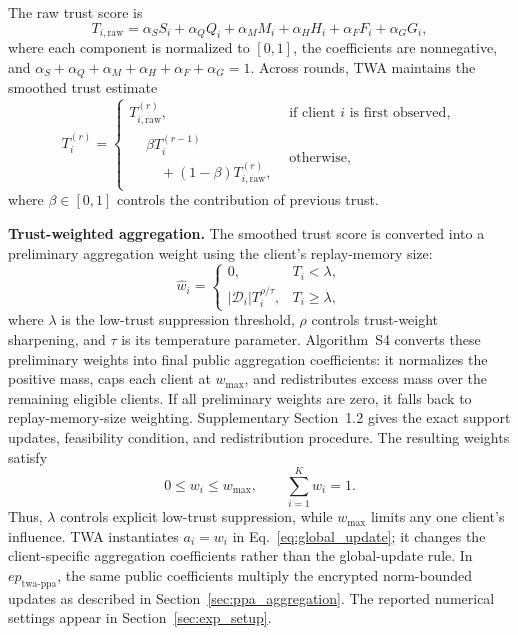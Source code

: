 \documentclass[journal]{IEEEtran}
\begin{document}
The raw trust score is
\begin{equation}
\label{eq:trust}
T_{i,\mathrm{raw}} =
\alpha_S S_i +
\alpha_Q Q_i +
\alpha_M M_i +
\alpha_H H_i +
\alpha_F F_i +
\alpha_G G_i,
\end{equation}
where each component is normalized to $[0,1]$, the coefficients are
nonnegative, and
$\alpha_S+\alpha_Q+\alpha_M+\alpha_H+\alpha_F+\alpha_G=1$.
Across rounds, TWA maintains the smoothed trust estimate
\begin{equation}
\label{eq:trust_smooth}
T_i^{(r)} =
\begin{cases}
T_{i,\mathrm{raw}}^{(r)},
& \text{if client $i$ is first observed},\\[1mm]
\begin{aligned}
&\beta T_i^{(r-1)}\\[-1mm]
&\quad +(1-\beta)T_{i,\mathrm{raw}}^{(r)},
\end{aligned}
& \text{otherwise},
\end{cases}
\end{equation}
where $\beta\in[0,1]$ controls the contribution of previous trust.

\textbf{Trust-weighted aggregation.}
The smoothed trust score is converted into a preliminary aggregation weight
using the client's replay-memory size:
\begin{equation}
\label{eq:weights_prelim}
\hat w_i =
\begin{cases}
0, & T_i < \lambda,\\[1mm]
|\mathcal D_i|T_i^{\rho/\tau}, & T_i \geq \lambda,
\end{cases}
\end{equation}
where $\lambda$ is the low-trust suppression threshold, $\rho$ controls
trust-weight sharpening, and $\tau$ is its temperature parameter.
Algorithm~S4 converts these preliminary weights into final public aggregation
coefficients: it normalizes the positive mass, caps each client at
$w_{\max}$, and redistributes excess mass over the remaining eligible clients.
If all preliminary weights are zero, it falls back to replay-memory-size
weighting. Supplementary Section~1.2 gives the exact support updates,
feasibility condition, and redistribution procedure. The resulting weights
satisfy
\begin{equation}
\label{eq:weights}
0\leq w_i\leq w_{\max},
\qquad
\sum_{i=1}^{K}w_i=1.
\end{equation}
Thus, $\lambda$ controls explicit low-trust suppression, while $w_{\max}$
limits any one client's influence. TWA instantiates $a_i=w_i$ in
Eq.~\eqref{eq:global_update}; it changes the client-specific aggregation
coefficients rather than the global-update rule. In
$ep_{\mathrm{twa\text{-}ppa}}$, the same public coefficients multiply the
encrypted norm-bounded updates as described in
Section~\ref{sec:ppa_aggregation}. The reported numerical settings appear in
Section~\ref{sec:exp_setup}.
\end{document}
